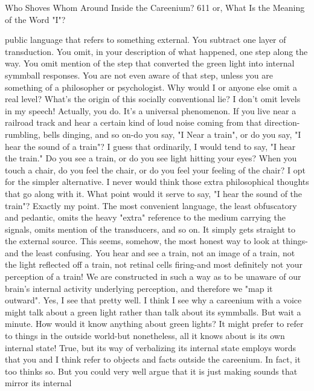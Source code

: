Who Shoves Whom Around Inside the Careenium?                                        611
or, What Is the Meaning of the Word "I"?

  public language that refers to something external. You subtract one layer of
  transduction. You omit, in your description of what happened, one step along the
  way. You omit mention of the step that converted the green light into internal
  symmball responses. You are not even aware of that step, unless you are something
  of a philosopher or psychologist.
\achilles Why would I or anyone else omit a real level? What's the origin of this
  socially conventional lie? I don't omit levels in my speech!
\tortoise Actually, you do. It's a universal phenomenon. If you live near a railroad
  track and hear a certain kind of loud noise coming from that direction-rumbling,
  bells dinging, and so on-do you say, "I Near a train", or do you say, "I hear the
  sound of a train"?
\achilles I guess that ordinarily, I would tend to say, "I hear the train."
\tortoise Do you see a train, or do you see light hitting your eyes? When you
  touch a chair, do you feel the chair, or do you feel your feeling of the chair?
\achilles I opt for the simpler alternative. I never would think those extra
  philosophical thoughts that go along with it. What point would it serve to say, "I
  hear the sound of the train"?
\tortoise Exactly my point. The most convenient language, the least obfuscatory
  and pedantic, omits the heavy "extra" reference to the medium carrying the signals,
  omits mention of the transducers, and so on. It simply gets straight to the external
  source. This seems, somehow, the most honest way to look at things-and the least
  confusing. You hear and see a train, not an image of a train, not the light reflected
  off a train, not retinal cells firing-and most definitely not your perception of a train!
  We are constructed in such a way as to be unaware of our brain's internal activity
  underlying perception, and therefore we "map it outward".
\achilles Yes, I see that pretty well. I think I see why a careenium with a voice
  might talk about a green light rather than talk about its symmballs. But wait a
  minute. How would it know anything about green lights? It might prefer to refer to
  things in the outside world-but nonetheless, all it knows about is its own internal
  state!
\tortoise True, but its way of verbalizing its internal state employs words that you
  and I think refer to objects and facts outside the careenium. In fact, it too thinks so.
  But you could very well argue that it is just making sounds that mirror its internal
